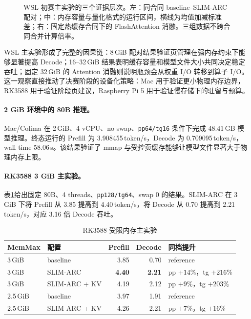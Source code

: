 \documentclass[a4paper]{article}
\begin{document}
\begin{figure}[H]
\caption{WSL 初赛主实验的三个证据层次。左：同合同 baseline--SLIM-ARC 配对；中：内存容量与量化格式的运行区间，横线为均值加减标准差；右：固定热缓存合同下的 FlashAttention 消融。三组数据不跨合同合并计算倍率。}
\label{fig:wsl-primary}
\end{figure}

WSL 主实验形成了完整的因果链：8\,GiB 配对结果验证页管理在强内存约束下能够显著提高 Decode；16--32\,GiB 结果表明缓存容量和模型文件大小共同决定稳定吞吐；固定 32\,GiB 的 Attention 消融则说明瓶颈会从权重 I/O 转移到算子 I/O。这一观察直接推动了决赛阶段的设备化策略：Mac 用于验证更小物理内存边界，RK3588 用于验证阶段页建议，Raspberry Pi 5 用于验证慢存储下的驻留与预算。

\paragraph{2 GiB 环境中的 80B 推理。}
Mac/Colima 在 2\,GiB、4 vCPU、no-swap、\texttt{pp64/tg16} 条件下完成 48.41\,GB 模型推理。终态运行的 Prefill 为 3.908455\,token/s，Decode 为 0.709095\,token/s，wall time 58.06\,s。该结果验证了 mmap 与受控页缓存能够让模型文件显著大于物理内存上限。

\paragraph{RK3588 3 GiB 主实验。}
表\ref{tab:rkmain}给出固定 80B、4 threads、\texttt{pp128/tg64}、swap 0 的结果。SLIM-ARC 在 3\,GiB 下将 Prefill 从 3.85 提高到 4.40\,token/s，将 Decode 从 0.70 提高到 2.21\,token/s，对应 3.16 倍 Decode 吞吐。

\begin{table}[H]
\centering
\caption{RK3588 受限内存主实验}
\label{tab:rkmain}
\begin{tabular}{llrrl}
\toprule
MemMax & 配置 & Prefill & Decode & 同档提升 \\
\midrule
3\,GiB & baseline & 3.85 & 0.70 & reference \\
3\,GiB & SLIM-ARC & \textbf{4.40} & \textbf{2.21} & pp $+14\%$，tg $+216\%$ \\
3\,GiB & SLIM-ARC + KV & 4.19 & 2.12 & pp $+9\%$，tg $+203\%$ \\
2.5\,GiB & baseline & 3.97 & 1.91 & reference \\
2.5\,GiB & SLIM-ARC + KV & 4.26 & 2.21 & pp $+7\%$，tg $+16\%$ \\
\bottomrule
\end{tabular}
\end{table}
\end{document}

